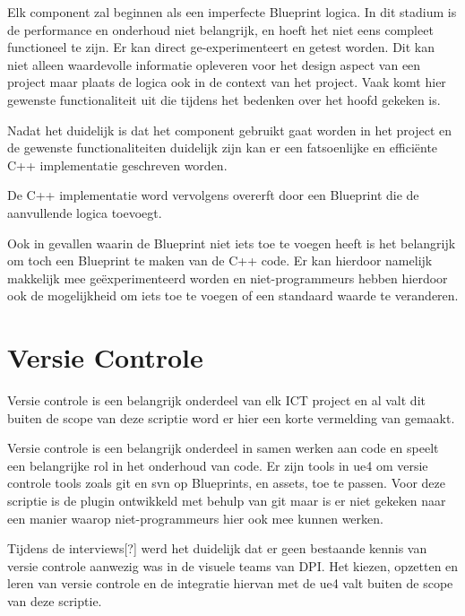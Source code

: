 Elk component zal beginnen als een imperfecte Blueprint logica. In dit stadium is de performance en onderhoud niet belangrijk, en hoeft het niet eens compleet functioneel te zijn. Er kan direct ge-experimenteert en getest worden. Dit kan niet alleen waardevolle informatie opleveren voor het design aspect van een project maar plaats de logica ook in de context van het project. Vaak komt hier gewenste functionaliteit uit die tijdens het bedenken over het hoofd gekeken is.

Nadat het duidelijk is dat het component gebruikt gaat worden in het project en de gewenste functionaliteiten duidelijk zijn kan er een fatsoenlijke en efficiënte C++ implementatie geschreven worden.

De C++ implementatie word vervolgens overerft door een Blueprint die de aanvullende logica toevoegt.

Ook in gevallen waarin de Blueprint niet iets toe te voegen heeft is het belangrijk om toch een Blueprint te maken van de C++ code. Er kan hierdoor namelijk makkelijk mee geëxperimenteerd worden en niet-programmeurs hebben hierdoor ook de mogelijkheid om iets toe te voegen of een standaard waarde te veranderen.

\section{Versie Controle}
Versie controle is een belangrijk onderdeel van elk ICT project en al valt dit buiten de scope van deze scriptie word er hier een korte vermelding van gemaakt.

Versie controle is een belangrijk onderdeel in samen werken aan code en speelt een belangrijke rol in het onderhoud van code. Er zijn tools in \gls{ue4} om versie controle tools zoals git en svn op Blueprints, en assets, toe te passen. Voor deze scriptie is de plugin ontwikkeld met behulp van git maar is er niet gekeken naar een manier waarop niet-programmeurs hier ook mee kunnen werken.

Tijdens de interviews[?] werd het duidelijk dat er geen bestaande kennis van versie controle aanwezig was in de visuele teams van DPI. Het kiezen, opzetten en leren van versie controle en de integratie hiervan met de \gls{ue4} valt buiten de scope van deze scriptie.